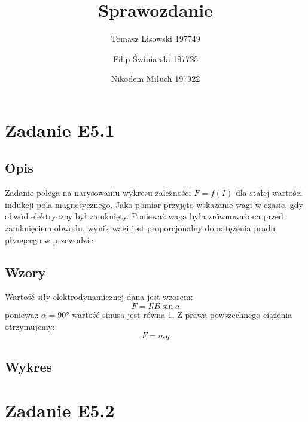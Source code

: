\documentclass{article} %
\title{Sprawozdanie}
\author{Tomasz Lisowski 197749\and Filip Świniarski 197725\and Nikodem Miłuch 197922}
\begin{document}
\maketitle


\section{Zadanie E5.1}
\subsection{Opis}

Zadanie polega na narysowaniu wykresu zależności $F = f(I)$ dla stałej wartości indukcji pola magnetycznego. Jako pomiar przyjęto wskazanie wagi w czasie, gdy obwód elektryczny był zamknięty. Ponieważ waga była zrównoważona przed zamknięciem obwodu, wynik wagi jest proporcjonalny do natężenia prądu płynącego w przewodzie.

\subsection{Wzory}
Wartość siły elektrodynamicznej dana jest wzorem:
{\large
\begin{equation}
    F = IlB\sin{a} 
\end{equation}}
ponieważ $\alpha = 90$° wartość sinusa jest równa 1. Z prawa powszechnego ciążenia otrzymujemy:
{\large
\begin{equation}
    F = mg 
\end{equation}}
\subsection{Wykres}
\section{Zadanie E5.2}
\end{document}
